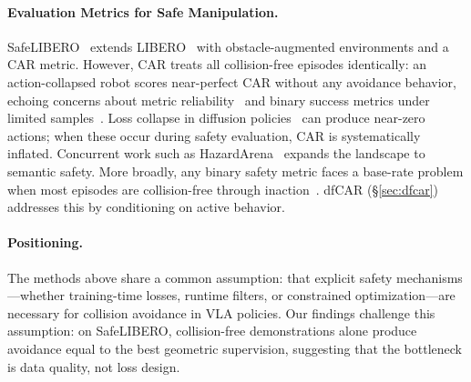 \paragraph{Evaluation Metrics for Safe Manipulation.}
SafeLIBERO~\cite{hu2025vlsa} extends LIBERO~\cite{liu2023libero} with obstacle-augmented environments and a CAR metric. However, CAR treats all collision-free episodes identically: an action-collapsed robot scores near-perfect CAR without any avoidance behavior, echoing concerns about metric reliability~\cite{karwowski2024goodhart,gururangan2018annotation} and binary success metrics under limited samples~\cite{snyder2026beyond}. Loss collapse in diffusion policies~\cite{dong2025conditioning} can produce near-zero actions; when these occur during safety evaluation, CAR is systematically inflated. Concurrent work such as HazardArena~\cite{chen2026hazardarena} expands the landscape to semantic safety. More broadly, any binary safety metric faces a base-rate problem when most episodes are collision-free through inaction~\cite{gururangan2018annotation}. dfCAR (\S\ref{sec:dfcar}) addresses this by conditioning on active behavior.

\paragraph{Positioning.}
The methods above share a common assumption: that explicit safety mechanisms---whether training-time losses, runtime filters, or constrained optimization---are necessary for collision avoidance in VLA policies. Our findings challenge this assumption: on SafeLIBERO, collision-free demonstrations alone produce avoidance equal to the best geometric supervision, suggesting that the bottleneck is data quality, not loss design.
